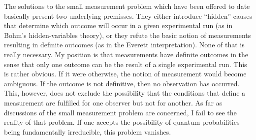 \documentclass[12pt,a4]{article}
\begin{document}
The solutions to the small measurement problem which have been offered to date basically present two underlying premisses. They either introduce ``hidden'' causes that determine which outcome will occur in a given experimental run (as in Bohm's hidden-variables theory), or they refute the basic notion of measurements resulting in definite outcomes (as in the Everett interpretation). None of that is really necessary. My position is that measurements have definite outcomes in the sense that only one outcome can be the result of a single experimental run. This is rather obvious. If it were otherwise, the notion of measurement would become ambiguous. If the outcome is not definitive, then no observation has occurred. This, however, does not exclude the possibility that the conditions that define a measurement are fulfilled for one observer but not for another. As far as discussions of the small measurement problem are concerned, I fail to see the reality of that problem. If one accepts the possibility of quantum probabilities being fundamentally irreducible, this problem vanishes. 
\end{document}
